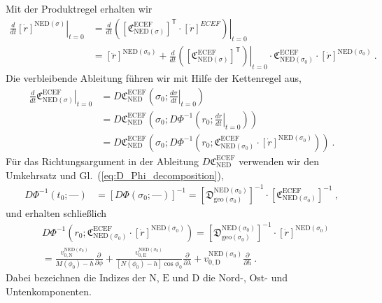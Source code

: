 \documentclass[10pt,a4paper]{article}
\newcommand{\nul}{\textrm{---}}
\newcommand{\trans}{^\mathsf{T}}
\begin{document}
Mit der Produktregel erhalten wir
\begin{align}
	\left.
	\frac{d}{dt}
	\left[
		\dot{r}
	\right]^{\mathrm{NED}(\sigma)}
	\right|_{t=0}
	&=
	\left.
	\frac{d}{dt}
	\left(
	\left[
		\mathfrak{C}^{\mathrm{ECEF}}_{\mathrm{NED}(\sigma)}
	\right]\trans
	\cdot
	\left[
		\dot{r}
	\right]^{ECEF}
	\right)
	\right|_{t=0}
	\nonumber\\
	&=
	\left[
		\ddot{r}
	\right]^{\mathrm{NED}(\sigma_0)}
	+ 
	\left.
	\frac{d}{dt}
	\left(
	\left[
		\mathfrak{C}^{\mathrm{ECEF}}_{\mathrm{NED}(\sigma)}
	\right]\trans
	\right)
	\right|_{t=0}
	\cdot
	\mathfrak{C}^{\mathrm{ECEF}}_{\mathrm{NED}(\sigma_0)}
	\cdot
	\left[
		\dot{r}
	\right]^{\mathrm{NED}(\sigma_0)}
	\ .	
\end{align}
Die verbleibende Ableitung führen wir mit Hilfe der Kettenregel aus,
\begin{align}
	\left.
	\frac{d}{dt}
	\mathfrak{C}^{\mathrm{ECEF}}_{\mathrm{NED}(\sigma)}
	\right|_{t=0}
	&=
	D\mathfrak{C}^{\mathrm{ECEF}}_{\mathrm{NED}}
	\left(
		\sigma_0;
	\left.
	\frac{d\sigma}{dt}
	\right|_{t=0}		
	\right)
	\nonumber\\
	&=
	D\mathfrak{C}^{\mathrm{ECEF}}_{\mathrm{NED}}
	\left(
		\sigma_0;
		D\Phi^{-1}\left(r_0; 	
		\left.
			\frac{dr}{dt}
		\right|_{t=0}	
		\right)		
	\right)	
	\nonumber\\
	&=
	D\mathfrak{C}^{\mathrm{ECEF}}_{\mathrm{NED}}
	\left(
		\sigma_0;
		D\Phi^{-1}\left(r_0; 	
		\mathfrak{C}^{\mathrm{ECEF}}_{\mathrm{NED}(\sigma_0)}
		\cdot
		\left[
			\dot{r}
		\right]^{\mathrm{NED}(\sigma_0)}
		\right)		
	\right)
	\ .	
\end{align}
Für das Richtungsargument in der Ableitung $D\mathfrak{C}^{\mathrm{ECEF}}_{\mathrm{NED}}$ verwenden wir den Umkehrsatz und Gl.~(\ref{eq:D_Phi_decomposition}),
\begin{align}
	D\Phi^{-1}(t_0; \nul)
	&=
	\left[
		D\Phi(\sigma_0; \nul)
	\right]^{-1} 
	=
	\left[
		\mathfrak{D}^{\mathrm{NED}(\sigma_0)}_{\mathrm{geo}(\sigma_0)}
	\right]^{-1}
	\cdot
	\left[
		\mathfrak{C}^{\mathrm{ECEF}}_{\mathrm{NED}(\sigma_0)}
	\right]^{-1}
	\ ,
\end{align}
und erhalten schließlich
\begin{align}
	&D\Phi^{-1}\left(r_0; 	
	\mathfrak{C}^{\mathrm{ECEF}}_{\mathrm{NED}(\sigma_0)}
	\cdot
	\left[
		\dot{r}
	\right]^{\mathrm{NED}(\sigma_0)}
	\right)
	=
	\left[
		\mathfrak{D}^{\mathrm{NED}(\sigma_0)}_{\mathrm{geo}(\sigma_0)}
	\right]^{-1}
	\cdot
	\left[
		\dot{r}
	\right]^{\mathrm{NED}(\sigma_0)}
	\nonumber\\
	&=
	\frac{v_{0,\mathrm{N}}^{\mathrm{NED}(\sigma_0)}}
	     {M(\phi_0) - h}
	\frac{\partial}{\partial\phi}
	+
	\frac{v_{0,\mathrm{E}}^{\mathrm{NED}(\sigma_0)}}
	     {[N(\phi_0) - h]\cos\phi_0}
	\frac{\partial}{\partial\lambda}
	+
	v_{0,\mathrm{D}}^{\mathrm{NED}(\sigma_0)}
	\frac{\partial}{\partial h}
	\ .
\end{align}
Dabei bezeichnen die Indizes der  $\mathrm{N}$, $\mathrm{E}$ und $\mathrm{D}$ die Nord-, Ost- und Untenkomponenten.
\end{document}
